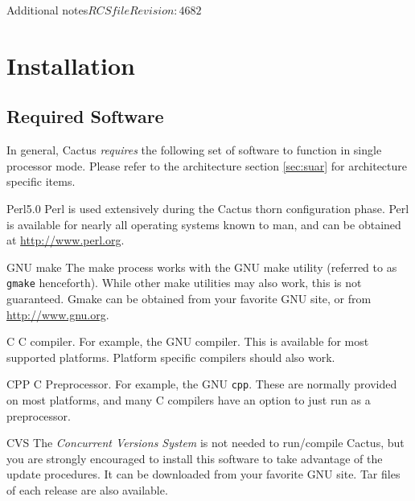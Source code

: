
\begin{cactuspart}{Additional notes}{$RCSfile$}{$Revision: 4682 $}\label{part:Notes}
\renewcommand{\thepage}{\Alph{part}\arabic{page}}




\chapter{Installation}
\label{cha:in}


\section{Required Software}
\label{sec:required_software}

In general, Cactus \emph{requires} the following set of software to function
in single processor mode. Please refer to the architecture section
\ref{sec:suar} for architecture specific items.
\begin{Lentry}
\item[Perl5.0] Perl is used extensively during the Cactus
  thorn configuration phase. Perl is available for nearly all
  operating systems known to man, and can be obtained at
  \url{http://www.perl.org}.
\item[GNU make] The make
  process works with the GNU make utility (referred to as \texttt{gmake}
  henceforth). While other make utilities may also work, this is not
  guaranteed. Gmake can be obtained from your favorite GNU site, or
  from \url{http://www.gnu.org}.
\item[C] C compiler. For example, the GNU compiler. This
 is available for most supported platforms.  Platform specific compilers
 should also work.
\item[CPP] C Preprocessor. For example, the GNU \texttt{cpp}.  These are
  normally provided on most platforms, and many C compilers have an option
  to just run as a preprocessor.
\item[CVS] The \textit{Concurrent Versions System} is not needed
  to run/compile Cactus, but you are strongly encouraged to install
  this software to take advantage of the update procedures. It can be
  downloaded from your favorite GNU site.  Tar files of each release are
  also available.
\end{Lentry}


\end{cactuspart}
